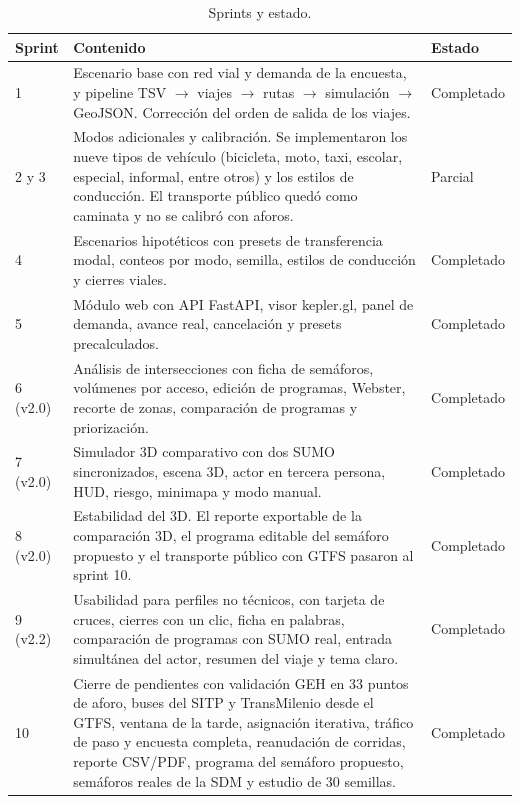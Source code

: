 \begin{table}[ht]
\renewcommand{\arraystretch}{1.15}
\centering
\small
\begin{tabular}{|p{2cm}|p{9.2cm}|p{2.8cm}|}
\hline
\textbf{Sprint} & \textbf{Contenido} & \textbf{Estado} \\ \hline
1 & Escenario base con red vial y demanda de la encuesta, y pipeline TSV $\rightarrow$ viajes $\rightarrow$ rutas $\rightarrow$ simulación $\rightarrow$ GeoJSON. Corrección del orden de salida de los viajes. & Completado \\ \hline
2 y 3 & Modos adicionales y calibración. Se implementaron los nueve tipos de vehículo (bicicleta, moto, taxi, escolar, especial, informal, entre otros) y los estilos de conducción. El transporte público quedó como caminata y no se calibró con aforos. & Parcial \\ \hline
4 & Escenarios hipotéticos con presets de transferencia modal, conteos por modo, semilla, estilos de conducción y cierres viales. & Completado \\ \hline
5 & Módulo web con API FastAPI, visor kepler.gl, panel de demanda, avance real, cancelación y presets precalculados. & Completado \\ \hline
6 (v2.0) & Análisis de intersecciones con ficha de semáforos, volúmenes por acceso, edición de programas, Webster, recorte de zonas, comparación de programas y priorización. & Completado \\ \hline
7 (v2.0) & Simulador 3D comparativo con dos SUMO sincronizados, escena 3D, actor en tercera persona, HUD, riesgo, minimapa y modo manual. & Completado \\ \hline
8 (v2.0) & Estabilidad del 3D. El reporte exportable de la comparación 3D, el programa editable del semáforo propuesto y el transporte público con GTFS pasaron al sprint 10. & Completado \\ \hline
9 (v2.2) & Usabilidad para perfiles no técnicos, con tarjeta de cruces, cierres con un clic, ficha en palabras, comparación de programas con SUMO real, entrada simultánea del actor, resumen del viaje y tema claro. & Completado \\ \hline
10 & Cierre de pendientes con validación GEH en 33 puntos de aforo, buses del SITP y TransMilenio desde el GTFS, ventana de la tarde, asignación iterativa, tráfico de paso y encuesta completa, reanudación de corridas, reporte CSV/PDF, programa del semáforo propuesto, semáforos reales de la SDM y estudio de 30 semillas. & Completado \\ \hline
\end{tabular}
\caption{Sprints y estado.}
\label{tab:sprints}
\end{table}

